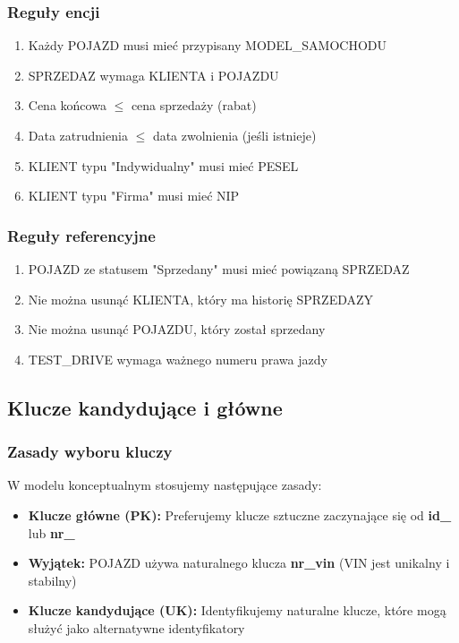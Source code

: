 \documentclass[a4paper,titleauthor]{mwart}
\begin{document}
	\subsubsection{Reguły encji}
	
	\begin{enumerate}
		\item Każdy POJAZD musi mieć przypisany MODEL\_SAMOCHODU
		\item SPRZEDAZ wymaga KLIENTA i POJAZDU
		\item Cena końcowa $\leq$ cena sprzedaży (rabat)
		\item Data zatrudnienia $\leq$ data zwolnienia (jeśli istnieje)
		\item KLIENT typu "Indywidualny" musi mieć PESEL
		\item KLIENT typu "Firma" musi mieć NIP
	\end{enumerate}
	
	\subsubsection{Reguły referencyjne}
	
	\begin{enumerate}
		\item POJAZD ze statusem "Sprzedany" musi mieć powiązaną SPRZEDAZ
		\item Nie można usunąć KLIENTA, który ma historię SPRZEDAZY
		\item Nie można usunąć POJAZDU, który został sprzedany
		\item TEST\_DRIVE wymaga ważnego numeru prawa jazdy
	\end{enumerate}
	
	\subsection{Klucze kandydujące i główne}
	
	\subsubsection{Zasady wyboru kluczy}
	
	W modelu konceptualnym stosujemy następujące zasady:
	\begin{itemize}
		\item \textbf{Klucze główne (PK):} Preferujemy klucze sztuczne zaczynające się od \textbf{id\_} lub \textbf{nr\_}
		\item \textbf{Wyjątek:} POJAZD używa naturalnego klucza \textbf{nr\_vin} (VIN jest unikalny i stabilny)
		\item \textbf{Klucze kandydujące (UK):} Identyfikujemy naturalne klucze, które mogą służyć jako alternatywne identyfikatory
	\end{itemize}
	
\end{document}
